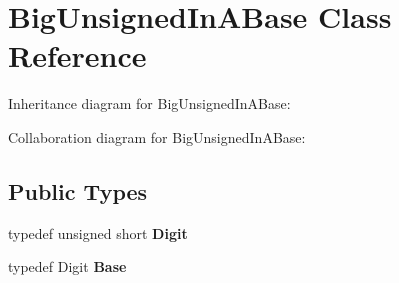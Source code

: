 \hypertarget{class_big_unsigned_in_a_base}{}\section{Big\+Unsigned\+In\+A\+Base Class Reference}
\label{class_big_unsigned_in_a_base}


Inheritance diagram for Big\+Unsigned\+In\+A\+Base\+:


Collaboration diagram for Big\+Unsigned\+In\+A\+Base\+:
\subsection*{Public Types}
\begin{DoxyCompactItemize}
\item 
\mbox{\label{class_big_unsigned_in_a_base_a266740bde3dfd4bf858bcf0211a86209}} 
typedef unsigned short {\bfseries Digit}
\item 
\mbox{\label{class_big_unsigned_in_a_base_a357d3922227fcb502acd69b5b9288bd1}} 
typedef Digit {\bfseries Base}
\end{DoxyCompactItemize}
